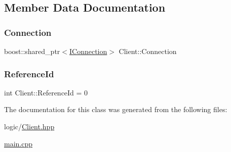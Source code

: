 \subsection{Member Data Documentation}
\mbox{\label{classClient_acf0b64183e7b92d030224c3ae9b54655}} 
\subsubsection{\texorpdfstring{Connection}{Connection}}
{\footnotesize\ttfamily boost\+::shared\+\_\+ptr$<$\mbox{\hyperlink{classIConnection}{I\+Connection}}$>$ Client\+::\+Connection}

\mbox{\label{classClient_a19fc58b997c5c69c2156a493983b0652}} 
\subsubsection{\texorpdfstring{Reference\+Id}{ReferenceId}}
{\footnotesize\ttfamily int Client\+::\+Reference\+Id = 0\hspace{0.3cm}{\ttfamily [static]}}



The documentation for this class was generated from the following files\+:\begin{DoxyCompactItemize}
\item 
logic/\mbox{\hyperlink{Client_8hpp}{Client.\+hpp}}\item 
\mbox{\hyperlink{main_8cpp}{main.\+cpp}}\end{DoxyCompactItemize}
